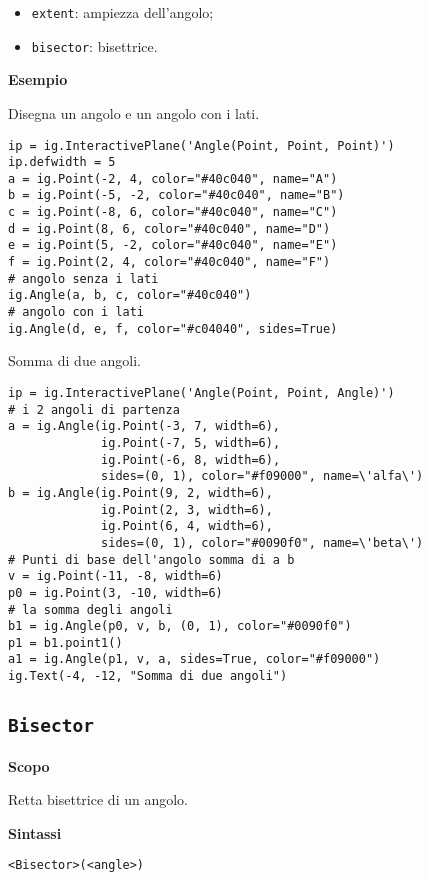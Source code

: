 \begin{itemize} [noitemsep]
\item \texttt{extent}: ampiezza dell'angolo;
\item \texttt{bisector}: bisettrice.
\end{itemize}

\textbf{Esempio}

Disegna un angolo e un angolo con i lati.

\begin{lstlisting}
ip = ig.InteractivePlane('Angle(Point, Point, Point)')
ip.defwidth = 5
a = ig.Point(-2, 4, color="#40c040", name="A")
b = ig.Point(-5, -2, color="#40c040", name="B")
c = ig.Point(-8, 6, color="#40c040", name="C")
d = ig.Point(8, 6, color="#40c040", name="D")
e = ig.Point(5, -2, color="#40c040", name="E")
f = ig.Point(2, 4, color="#40c040", name="F")
# angolo senza i lati
ig.Angle(a, b, c, color="#40c040")
# angolo con i lati
ig.Angle(d, e, f, color="#c04040", sides=True)
\end{lstlisting}

Somma di due angoli.

\begin{lstlisting}
ip = ig.InteractivePlane('Angle(Point, Point, Angle)')
# i 2 angoli di partenza
a = ig.Angle(ig.Point(-3, 7, width=6),
             ig.Point(-7, 5, width=6),
             ig.Point(-6, 8, width=6),
             sides=(0, 1), color="#f09000", name=\'alfa\')
b = ig.Angle(ig.Point(9, 2, width=6),
             ig.Point(2, 3, width=6),
             ig.Point(6, 4, width=6),
             sides=(0, 1), color="#0090f0", name=\'beta\')
# Punti di base dell'angolo somma di a b
v = ig.Point(-11, -8, width=6)
p0 = ig.Point(3, -10, width=6)
# la somma degli angoli
b1 = ig.Angle(p0, v, b, (0, 1), color="#0090f0")
p1 = b1.point1()
a1 = ig.Angle(p1, v, a, sides=True, color="#f09000")
ig.Text(-4, -12, "Somma di due angoli")
\end{lstlisting}


\subsection{\texttt{Bisector}}
\label{sub:geoint_bisector}
\textbf{Scopo}

Retta bisettrice di un angolo.

\textbf{Sintassi}

\begin{lstlisting}
<Bisector>(<angle>)
\end{lstlisting}

